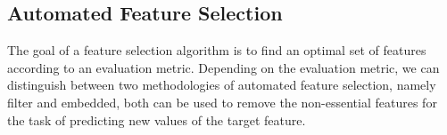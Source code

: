 \documentclass[preprint,12pt]{elsarticle}
\begin{document}


\subsection{Automated Feature Selection}
The goal of a feature selection algorithm is to find an optimal set of features according to an evaluation metric. Depending on the evaluation metric, we can distinguish between two methodologies of automated feature selection, namely filter and embedded, both can be used to remove the non-essential features for the task of predicting new values of the target feature.
\end{document}
